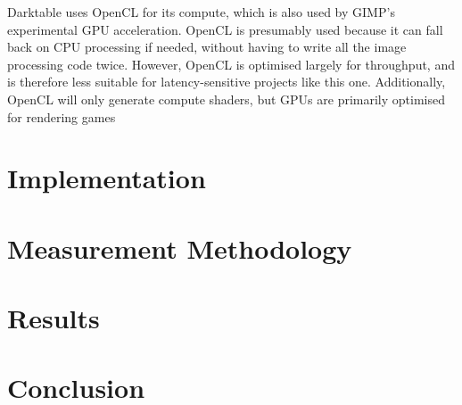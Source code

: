 \documentclass[12pt]{article}
\begin{document}
Darktable uses OpenCL for its compute, which is also used by GIMP's experimental GPU acceleration.
OpenCL is presumably used because it can fall back on CPU processing if needed, without having to
write all the image processing code twice.  However, OpenCL is optimised largely for throughput, and
is therefore less suitable for latency-sensitive projects like this one.  Additionally, OpenCL will
only generate compute shaders, but GPUs are primarily optimised for rendering games



\section{Implementation}



\section{Measurement Methodology}

\section{Results}

\section{Conclusion}



\pagebreak

\begin{thebibliography}{9}
\end{thebibliography}
\end{document}
